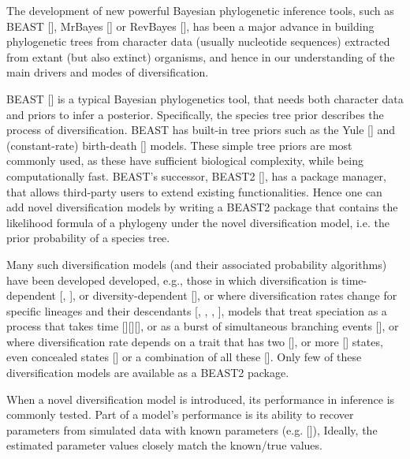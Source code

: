 \documentclass{article}
\begin{document}
The development of new powerful Bayesian phylogenetic inference tools, 
such as BEAST [\cite{drummond2007beast}], 
MrBayes [\cite{huelsenbeck2001mrbayes}]
or RevBayes [\cite{hohna2016revbayes}], 
has been a major advance in building phylogenetic trees 
from character data (usually nucleotide sequences) extracted 
from extant (but also extinct) organisms, and hence in our understanding of the main drivers and modes of diversification.

BEAST [\cite{drummond2007beast}] is a typical Bayesian phylogenetics tool, 
that needs both character data and priors to infer a posterior.
Specifically, the species tree prior describes the process of diversification.
BEAST has built-in tree priors such as the Yule [\cite{yule}] and 
(constant-rate) birth-death [\cite{nee1994reconstructed}] models.
These simple tree priors are most commonly used, as these 
have sufficient biological complexity, while being computationally fast.
BEAST's successor, BEAST2 [\cite{bouckaert2014beast}],
has a package manager, that allows third-party users to extend existing 
functionalities.
Hence one can add novel diversification models by writing a BEAST2 package that contains the likelihood formula
of a phylogeny under the novel diversification model, i.e. the prior probability of a species tree.

Many such diversification models (and their associated probability 
algorithms) have been developed
developed, e.g., those in which diversification is 
time-dependent [\cite{nee1994reconstructed}, \cite{rabosky2008explosive}], 
or diversity-dependent [\cite{etienne2011diversity}],
or where diversification rates change for specific lineages and their descendants [\cite{etienne2012conceptual}, 
\cite{rabosky2014automatic}, \cite{alfaro2009nine}, \cite{laudanno2018sls}], models that treat speciation as a process that takes 
time [\cite{rosindell2010protracted}][\cite{etienne2012prolonging}][\cite{lambert2015reconstructed}], 
or as a burst of simultaneous branching
events [\cite{laudanno2018mbd}], or where diversification rate
depends on a trait that has two [\cite{maddison2007estimating}], 
or more [\cite{fitzjohn2012diversitree}] states,
even concealed states [\cite{beaulieu2016detecting}] 
or a combination of all these [\cite{herrera2018detecting}].
Only few of these diversification models are available as a BEAST2 package.

When a novel diversification model is introduced,
its performance in inference is commonly tested.
Part of a model's performance is its ability to recover parameters from simulated data with known parameters (e.g. [\cite{etienne2014estimating}]),
Ideally, the estimated parameter values closely match the known/true values.
\end{document}
